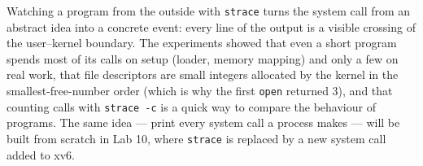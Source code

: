 \documentclass[12pt,a4paper]{article}
\begin{document}
Watching a program from the outside with \texttt{strace} turns the system call from an abstract idea into a concrete event: every line of the output is a visible crossing of the user--kernel boundary. The experiments showed that even a short program spends most of its calls on setup (loader, memory mapping) and only a few on real work, that file descriptors are small integers allocated by the kernel in the smallest-free-number order (which is why the first \texttt{open} returned 3), and that counting calls with \texttt{strace -c} is a quick way to compare the behaviour of programs. The same idea --- print every system call a process makes --- will be built from scratch in Lab 10, where \texttt{strace} is replaced by a new system call added to xv6.
\end{document}
